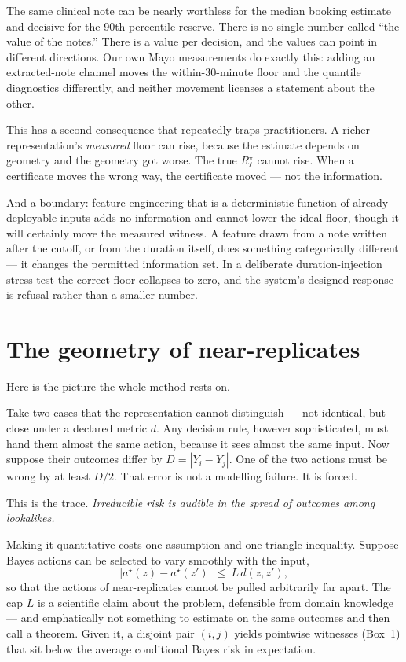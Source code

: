 \documentclass[11pt,a4paper]{article}
\newcommand{\risk}{R^{\star}}
\begin{document}
The same clinical note can be nearly worthless for the median booking estimate and decisive for the 90th-percentile reserve. There is no single number called ``the value of the notes.'' There is a value per decision, and the values can point in different directions. Our own Mayo measurements do exactly this: adding an extracted-note channel moves the within-30-minute floor and the quantile diagnostics differently, and neither movement licenses a statement about the other.

This has a second consequence that repeatedly traps practitioners. A richer representation's \emph{measured} floor can rise, because the estimate depends on geometry and the geometry got worse. The true $\risk_\ell$ cannot rise. When a certificate moves the wrong way, the certificate moved --- not the information.

And a boundary: feature engineering that is a deterministic function of already-deployable inputs adds no information and cannot lower the ideal floor, though it will certainly move the measured witness. A feature drawn from a note written after the cutoff, or from the duration itself, does something categorically different --- it changes the permitted information set. In a deliberate duration-injection stress test the correct floor collapses to zero, and the system's designed response is refusal rather than a smaller number.

\section{The geometry of near-replicates}

Here is the picture the whole method rests on.

Take two cases that the representation cannot distinguish --- not identical, but close under a declared metric $d$. Any decision rule, however sophisticated, must hand them almost the same action, because it sees almost the same input. Now suppose their outcomes differ by $D=|Y_i-Y_j|$. One of the two actions must be wrong by at least $D/2$. That error is not a modelling failure. It is forced.

This is the trace. \emph{Irreducible risk is audible in the spread of outcomes among lookalikes.}

Making it quantitative costs one assumption and one triangle inequality. Suppose Bayes actions can be selected to vary smoothly with the input,
\[
|a^\star(z)-a^\star(z')|\ \leq\ L\,d(z,z'),
\]
so that the actions of near-replicates cannot be pulled arbitrarily far apart. The cap $L$ is a scientific claim about the problem, defensible from domain knowledge --- and emphatically not something to estimate on the same outcomes and then call a theorem. Given it, a disjoint pair $(i,j)$ yields pointwise witnesses (Box~1) that sit below the average conditional Bayes risk in expectation.
\end{document}
